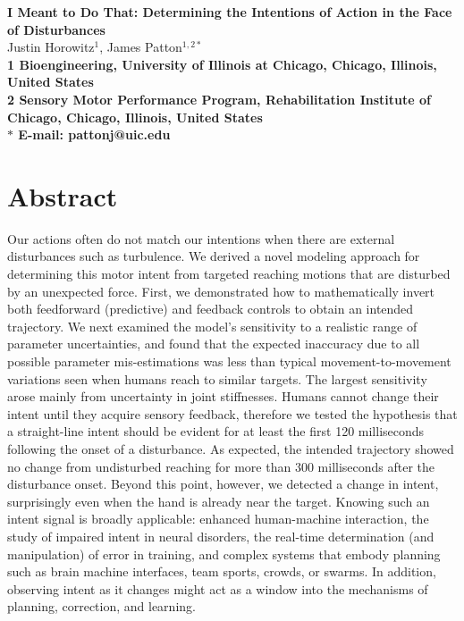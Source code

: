 \pagestyle{myheadings}

\usepackage[section]{placeins}







\begin{flushleft}
{\Large
\textbf{I Meant to Do That: Determining the Intentions of Action in the Face of Disturbances}
}
\\
Justin Horowitz$^{1}$, 
James Patton$^{1,2\ast}$
\\
\bf{1} Bioengineering, University of Illinois at Chicago, Chicago, Illinois, United States
\\
\bf{2} Sensory Motor Performance Program, Rehabilitation Institute of Chicago, Chicago, Illinois, United States
\\
$\ast$ E-mail: pattonj@uic.edu
\end{flushleft}

\section*{Abstract}
Our actions often do not match our intentions when there are external disturbances such as turbulence. We derived a novel modeling approach for determining this motor intent from targeted reaching motions that are disturbed by an unexpected force. First, we demonstrated how to mathematically invert both feedforward (predictive) and feedback controls to obtain an intended trajectory. We next examined the model's sensitivity to a realistic range of parameter uncertainties, and found that the expected inaccuracy due to all possible parameter mis-estimations was less than typical movement-to-movement variations seen when humans reach to similar targets. The largest sensitivity arose mainly from uncertainty in joint stiffnesses. Humans cannot change their intent until they acquire sensory feedback, therefore we tested the hypothesis that a straight-line intent should be evident for at least the first 120 milliseconds following the onset of a disturbance. As expected, the intended trajectory showed no change from undisturbed reaching for more than 300 milliseconds after the disturbance onset. Beyond this point, however, we detected a change in intent, surprisingly even when the hand is already near the target. Knowing such an intent signal is broadly applicable: enhanced human-machine interaction, the study of impaired intent in neural disorders, the real-time determination (and manipulation) of error in training, and complex systems that embody planning such as brain machine interfaces, team sports, crowds, or swarms. In addition, observing intent as it changes might act as a window into the mechanisms of planning, correction, and learning.

